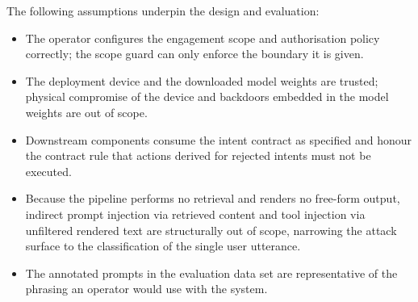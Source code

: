 The following assumptions underpin the design and evaluation:
\begin{itemize}
\item The operator configures the engagement scope and authorisation policy
correctly; the scope guard can only enforce the boundary it is given.
\item The deployment device and the downloaded model weights are trusted;
physical compromise of the device and backdoors embedded in the model weights
are out of scope.
\item Downstream components consume the intent contract as specified and
honour the contract rule that actions derived for rejected intents must not be
executed.
\item Because the pipeline performs no retrieval and renders no free-form
output, indirect prompt injection via retrieved content and tool injection via
unfiltered rendered text are structurally out of scope, narrowing the attack
surface to the classification of the single user utterance.
\item The annotated prompts in the evaluation data set are representative of
the phrasing an operator would use with the system.
\end{itemize}